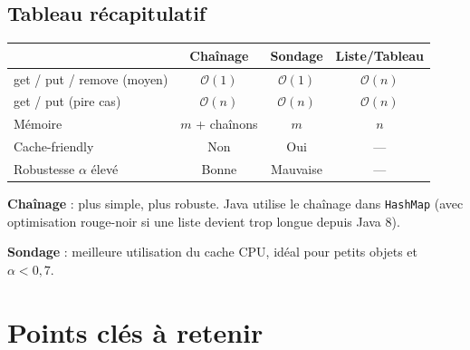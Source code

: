 \documentclass[11pt,a4paper]{article}
\newcommand{\bigO}{\mathcal{O}}
\begin{document}
\subsection{Tableau récapitulatif}

\begin{center}
\renewcommand{\arraystretch}{1.4}
\begin{tabular}{@{}lccc@{}}
\toprule
 & \textbf{Chaînage} & \textbf{Sondage} & \textbf{Liste/Tableau} \\
\midrule
get / put / remove (moyen) & $\bigO(1)$ & $\bigO(1)$ & $\bigO(n)$ \\
get / put (pire cas)        & $\bigO(n)$ & $\bigO(n)$ & $\bigO(n)$ \\
Mémoire                      & $m$ + chaînons & $m$ & $n$ \\
Cache-friendly               & Non & Oui & --- \\
Robustesse $\alpha$ élevé    & Bonne & Mauvaise & --- \\
\bottomrule
\end{tabular}
\end{center}

\begin{retenirbox}[En pratique]
\textbf{Chaînage} : plus simple, plus robuste. Java utilise le chaînage dans \texttt{HashMap} (avec optimisation rouge-noir si une liste devient trop longue depuis Java 8).

\medskip
\textbf{Sondage} : meilleure utilisation du cache CPU, idéal pour petits objets et $\alpha < 0{,}7$.
\end{retenirbox}


\section{Points clés à retenir}
\end{document}

